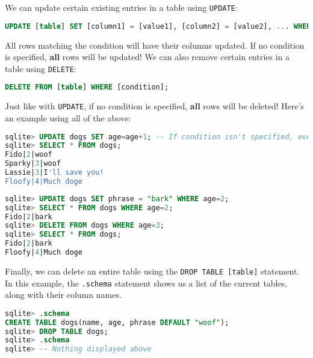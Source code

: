 We can update certain existing entries in a table using \texttt{UPDATE}:
\begin{lstlisting}[language=SQL]
UPDATE [table] SET [column1] = [value1], [column2] = [value2], ... WHERE [condition];
\end{lstlisting}
All rows matching the condition will have their columns updated. If no
condition is specified, \textbf{all} rows will be updated! We can also
remove certain entries in a table using \texttt{DELETE}:
\begin{lstlisting}[language=SQL]
DELETE FROM [table] WHERE [condition];
\end{lstlisting}
Just like with \texttt{UPDATE}, if no condition is specified,
\textbf{all} rows will be deleted!  Here's an example using all of the
above:
\begin{lstlisting}[language=SQL]
sqlite> UPDATE dogs SET age=age+1; -- If condition isn't specified, every row is updated
sqlite> SELECT * FROM dogs;
Fido|2|woof
Sparky|3|woof
Lassie|3|I'll save you!
Floofy|4|Much doge
\end{lstlisting}
\begin{lstlisting}[language=SQL]
sqlite> UPDATE dogs SET phrase = "bark" WHERE age=2;
sqlite> SELECT * FROM dogs WHERE age=2;
Fido|2|bark
sqlite> DELETE FROM dogs WHERE age=3;
sqlite> SELECT * FROM dogs;
Fido|2|bark
Floofy|4|Much doge
\end{lstlisting}
Finally, we can delete an entire table using the \texttt{DROP TABLE
[table]} statement. In this example, the \texttt{.schema} statement shows
us a list of the current tables, along with their column names.
\begin{lstlisting}[language=SQL]
sqlite> .schema
CREATE TABLE dogs(name, age, phrase DEFAULT "woof");
sqlite> DROP TABLE dogs;
sqlite> .schema
sqlite> -- Nothing displayed above
\end{lstlisting}
